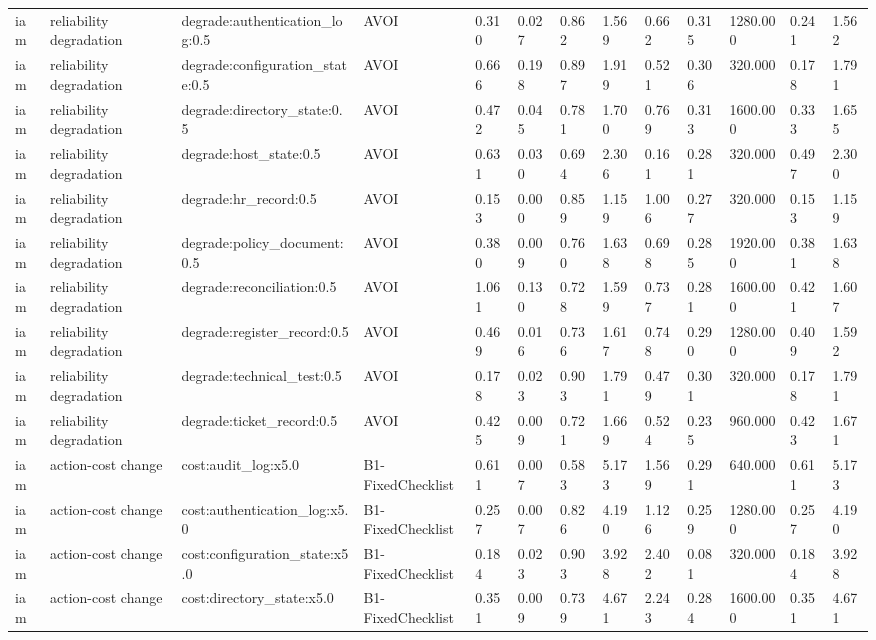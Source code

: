 \begin{table}[!ht]
{\begin{tabular}{lllllllllllll}
iam & reliability degradation & degrade:authentication\_log:0.5 & AVOI & 0.310 & 0.027 & 0.862 & 1.569 & 0.662 & 0.315 & 1280.000 & 0.241 & 1.562 \\
iam & reliability degradation & degrade:configuration\_state:0.5 & AVOI & 0.666 & 0.198 & 0.897 & 1.919 & 0.521 & 0.306 & 320.000 & 0.178 & 1.791 \\
iam & reliability degradation & degrade:directory\_state:0.5 & AVOI & 0.472 & 0.045 & 0.781 & 1.700 & 0.769 & 0.313 & 1600.000 & 0.333 & 1.655 \\
iam & reliability degradation & degrade:host\_state:0.5 & AVOI & 0.631 & 0.030 & 0.694 & 2.306 & 0.161 & 0.281 & 320.000 & 0.497 & 2.300 \\
iam & reliability degradation & degrade:hr\_record:0.5 & AVOI & 0.153 & 0.000 & 0.859 & 1.159 & 1.006 & 0.277 & 320.000 & 0.153 & 1.159 \\
iam & reliability degradation & degrade:policy\_document:0.5 & AVOI & 0.380 & 0.009 & 0.760 & 1.638 & 0.698 & 0.285 & 1920.000 & 0.381 & 1.638 \\
iam & reliability degradation & degrade:reconciliation:0.5 & AVOI & 1.061 & 0.130 & 0.728 & 1.599 & 0.737 & 0.281 & 1600.000 & 0.421 & 1.607 \\
iam & reliability degradation & degrade:register\_record:0.5 & AVOI & 0.469 & 0.016 & 0.736 & 1.617 & 0.748 & 0.290 & 1280.000 & 0.409 & 1.592 \\
iam & reliability degradation & degrade:technical\_test:0.5 & AVOI & 0.178 & 0.023 & 0.903 & 1.791 & 0.479 & 0.301 & 320.000 & 0.178 & 1.791 \\
iam & reliability degradation & degrade:ticket\_record:0.5 & AVOI & 0.425 & 0.009 & 0.721 & 1.669 & 0.524 & 0.235 & 960.000 & 0.423 & 1.671 \\
iam & action-cost change & cost:audit\_log:x5.0 & B1-FixedChecklist & 0.611 & 0.007 & 0.583 & 5.173 & 1.569 & 0.291 & 640.000 & 0.611 & 5.173 \\
iam & action-cost change & cost:authentication\_log:x5.0 & B1-FixedChecklist & 0.257 & 0.007 & 0.826 & 4.190 & 1.126 & 0.259 & 1280.000 & 0.257 & 4.190 \\
iam & action-cost change & cost:configuration\_state:x5.0 & B1-FixedChecklist & 0.184 & 0.023 & 0.903 & 3.928 & 2.402 & 0.081 & 320.000 & 0.184 & 3.928 \\
iam & action-cost change & cost:directory\_state:x5.0 & B1-FixedChecklist & 0.351 & 0.009 & 0.739 & 4.671 & 2.243 & 0.284 & 1600.000 & 0.351 & 4.671 \\

\end{tabular}}
\end{table}
